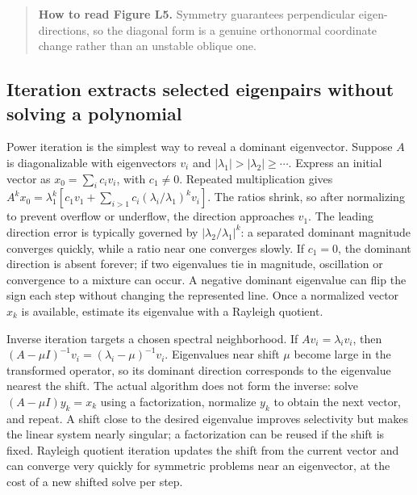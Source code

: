 
\begin{quote}
\textbf{How to read Figure L5.} Symmetry guarantees perpendicular eigen-directions, so the diagonal form is a genuine orthonormal coordinate change rather than an unstable oblique one.
\end{quote}

\subsection{Iteration extracts selected eigenpairs without solving a polynomial}\label{01-foundations-i-ch020-iteration-extracts-selected-eigenpairs-without-solving-a-polynomial}

\hypertarget{01-foundations-i-ch020-iteration-extracts-selected-eigenpairs-without-solving-a-polynomial}{}

Power iteration is the simplest way to reveal a dominant eigenvector. Suppose \(A\) is diagonalizable with eigenvectors \(v_i\) and \(|\lambda_1|>|\lambda_2|\ge\cdots\). Express an initial vector as \(x_0=\sum_i c_i v_i\), with \(c_1\ne0\). Repeated multiplication gives \(A^kx_0=\lambda_1^k[c_1v_1+\sum_{i>1}c_i(\lambda_i/\lambda_1)^kv_i]\). The ratios shrink, so after normalizing to prevent overflow or underflow, the direction approaches \(v_1\). The leading direction error is typically governed by \(|\lambda_2/\lambda_1|^k\): a separated dominant magnitude converges quickly, while a ratio near one converges slowly. If \(c_1=0\), the dominant direction is absent forever; if two eigenvalues tie in magnitude, oscillation or convergence to a mixture can occur. A negative dominant eigenvalue can flip the sign each step without changing the represented line. Once a normalized vector \(x_k\) is available, estimate its eigenvalue with a Rayleigh quotient.

Inverse iteration targets a chosen spectral neighborhood. If \(Av_i=\lambda_i v_i\), then \((A-\mu I)^{-1}v_i=(\lambda_i-\mu)^{-1}v_i\). Eigenvalues near shift \(\mu\) become large in the transformed operator, so its dominant direction corresponds to the eigenvalue nearest the shift. The actual algorithm does not form the inverse: solve \((A-\mu I)y_k=x_k\) using a factorization, normalize \(y_k\) to obtain the next vector, and repeat. A shift close to the desired eigenvalue improves selectivity but makes the linear system nearly singular; a factorization can be reused if the shift is fixed. Rayleigh quotient iteration updates the shift from the current vector and can converge very quickly for symmetric problems near an eigenvector, at the cost of a new shifted solve per step.

